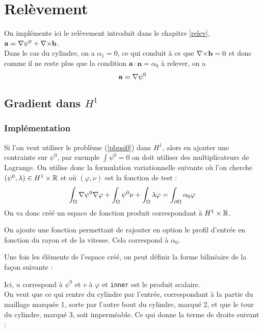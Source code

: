 \chapter{Relèvement}
On implémente ici le relèvement introduit dans le chapitre \ref{relev}, $\mathbf{a}={\nabla}\psi^0+{\nabla\times}\mathbf{b}$.\\
Dans le cas du cylindre, on a $\alpha_1=0$, ce qui conduit à ce que ${\nabla\times} \mathbf{b}=0$ et donc comme il ne reste plus que la condition $\mathbf{a}\cdot\mathbf{n}=\alpha_0$ à relever, on a \[ \mathbf{a}={\nabla}\psi^0 \]

\section{Gradient dans $H^1$}
\label{impGradh1}
\subsection{Implémentation}
Si l'on veut utiliser le problème (\ref{pbpsi0}) dans $H^1$, alors en ajouter une contrainte sur $\psi^0$, par exemple $\int \psi^0 = 0$ on doit utiliser des multiplicateurs de Lagrange. On utilise donc la formulation variationnelle suivante où l'on cherche $(\psi^0,\lambda)\in H^1\times{\mathbb{R}}$ et où $(\varphi,\nu)$ est la fonction de test :
\[ \int_\Omega{\nabla} \psi^0{\nabla}\varphi + \int_\Omega \psi^0\nu + \int_\Omega \lambda\varphi = \int_{\partial\Omega} \alpha_0\varphi \]
On va donc créé un espace de fonction produit correspondant à $H^1\times{\mathbb{R}}$.



On ajoute une fonction permettant de rajouter en option le profil d'entrée en fonction du rayon et de la vitesse. Cela correspond à $\alpha_0$.



Une fois les éléments de l'espace créé, on peut définir la forme bilinéaire de la façon suivante :



Ici, $u$ correspond à $\psi^0$ et $v$ à $\varphi$ et \texttt{inner} est le produit scalaire.\\

On veut que ce qui rentre du cylindre par l'entrée, correspondant à la partie du maillage marquée 1, sorte par l'autre bout du cylindre, marqué 2, et que le tour du cylindre, marqué 3, soit imperméable. Ce qui donne la terme de droite suivant :

